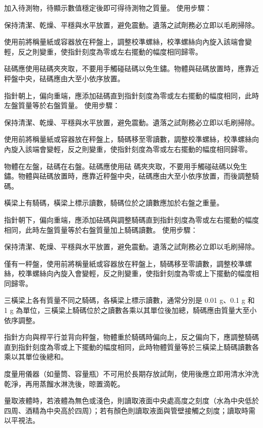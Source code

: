 \documentclass[a4paper,12pt]{article}
\begin{document}
\item 加入待測物，待顯示數值穩定後即可得待測物之質量。
\een
{}
使用步驟：
\ben
\item 保持清潔、乾燥、平穩與水平放置，避免震動。遺落之試劑務必立即以毛刷掃除。
\item 使用前將稱量紙或容器放在秤盤上，調整校準螺絲，校準螺絲向內旋入該端會變輕，反之則變重，使指針刻度為零或左右擺動的幅度相同歸零。
\item 砝碼應使用砝碼夾夾取，不要用手觸碰砝碼以免生鏽。物體與砝碼放置時，應靠近秤盤中央，砝碼應由大至小依序放置。
\item 指針朝上，偏向重端，應添加砝碼直到指針刻度為零或左右擺動的幅度相同，此時左盤質量等於右盤質量。
\een
{}
使用步驟：
\ben
\item 保持清潔、乾燥、平穩與水平放置，避免震動。遺落之試劑務必立即以毛刷掃除。
\item 使用前將稱量紙或容器放在秤盤上，騎碼移至零讀數，調整校準螺絲，校準螺絲向內旋入該端會變輕，反之則變重，使指針刻度為零或左右擺動的幅度相同歸零。
\item 物體在左盤，砝碼在右盤。砝碼應使用砝
碼夾夾取，不要用手觸碰砝碼以免生鏽。物體與砝碼放置時，應靠近秤盤中央，砝碼應由大至小依序放置，而後調整騎碼。
\item 橫梁上有騎碼，橫梁上標示讀數，騎碼位於之讀數應加於右盤之重量。
\item 指針朝下，偏向重端，應添加砝碼與調整騎碼直到指針刻度為零或左右擺動的幅度相同，此時左盤質量等於右盤質量加上騎碼讀數。
\een
{}
使用步驟：
\ben
\item 保持清潔、乾燥、平穩與水平放置，避免震動。遺落之試劑務必立即以毛刷掃除。
\item 僅有一秤盤，使用前將稱量紙或容器放在秤盤上，騎碼移至零讀數，調整校準螺絲，校準螺絲向內旋入會變輕，反之則變重，使指針刻度為零或上下擺動的幅度相同歸零。
\item 三橫梁上各有質量不同之騎碼，各橫梁上標示讀數，通常分別是 0.01 g、0.1 g 和 1 g 為單位，三橫梁上騎碼位於之讀數各乘以其單位後加總，騎碼應由質量大至小依序調整。
\item 指針方向與桿平行並背向秤盤，物體重於騎碼時偏向上，反之偏向下，應調整騎碼直到指針刻度為零或上下擺動的幅度相同，此時物體質量等於三橫梁上騎碼讀數各乘以其單位後總和。
\een
{}
\bit
\item 度量用儀器（如量筒、容量瓶）不可用於長期存放試劑，使用後應立即用清水沖洗乾淨，再用蒸餾水淋洗後，晾置滴乾。
\item 量取液體時，若液體為無色或淺色，則讀取液面中央處高度之刻度（水為中央低於四周、酒精為中央高於四周）；若有顏色則讀取液面與管壁接觸之刻度；讀取時需以平視法。
\end{document}
